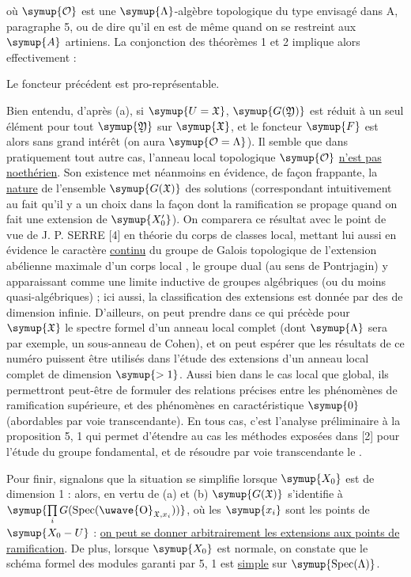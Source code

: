 où $\symup{\mathcal O}$ est une $\symup{\Lambda}$-algèbre topologique du type envisagé dans A,
paragraphe 5, ou de dire qu'il en est de même quand on se restreint aux $\symup{A}$
artiniens. La conjonction des théorèmes 1 et 2 implique alors effectivement :

 Le foncteur précédent est pro-représentable.

Bien entendu, d'après (a), si $\symup{U=\mathfrak X}$, $\symup{G(\mathfrak Y)}$ est réduit à
un seul élément pour tout $\symup{\mathfrak Y}$ sur $\symup{\mathfrak X}$, et le foncteur $\symup{F}$
est alors sans grand intérêt (on aura $\symup{\mathcal O=\Lambda}$). Il semble que dans
pratiquement tout autre cas, l'anneau local topologique $\symup{\mathcal O}$ \uline{n'est pas
noethérien}. Son existence met néanmoins en évidence, de façon frappante, la
\uline{nature}  de l'ensemble $\symup{G(\mathfrak X)}$ des solutions
(correspondant intuitivement au fait qu'il y a un choix  dans la
façon dont la ramification se propage quand on fait une extension de $\symup{X'_0}$).
On comparera ce résultat avec le point de vue de J. P. SERRE [4] en théorie du
corps de classes local, mettant lui aussi en évidence le caractère \uline{continu} du
groupe de Galois topologique de l'extension abélienne maximale d'un corps local
, le groupe dual (au sens de Pontrjagin) y apparaissant comme
une limite inductive de groupes algébriques (ou du moins quasi-algébriques) ;
ici aussi, la classification des extensions est donnée par des  de
dimension infinie. D'ailleurs, on peut prendre dans ce qui précède pour
$\symup{\mathfrak X}$ le spectre formel d'un anneau local complet (dont $\symup{\Lambda}$ sera
par exemple, un sous-anneau de Cohen), et on peut espérer que les résultats de
ce numéro puissent être utilisés dans l'étude des extensions d'un anneau local
complet de dimension $\symup{>1}$. Aussi bien dans le cas local que global, ils
permettront peut-être de formuler des relations précises entre les phénomènes
de ramification supérieure, et des phénomènes en caractéristique $\symup{0}$
(abordables par voie transcendante). En tous cas, c'est l'analyse préliminaire
à la proposition 5, 1 qui permet d'étendre au cas  les
méthodes exposées dans [2] pour l'étude du groupe fondamental, et de résoudre
par voie transcendante le .

Pour finir, signalons que la situation se simplifie lorsque $\symup{X_0}$ est de dimension 1 : alors, en vertu de (a) et (b) $\symup{G(\mathfrak X)}$ s'identifie à $\symup{\prod\limits_i G(\operatorname{Spec}(\text{\uwave{O}}_{\mathfrak X,x_i}))}$, où les $\symup{x_i}$ sont les points de $\symup{X_0-U}$ : \uline{on peut se donner arbitrairement les extensions  aux points de ramification}. De plus, lorsque $\symup{X_0}$ est normale, on constate que le schéma formel des modules garanti par 5, 1 est \uline{simple} sur $\symup{\operatorname{Spec}(\Lambda)}$.


